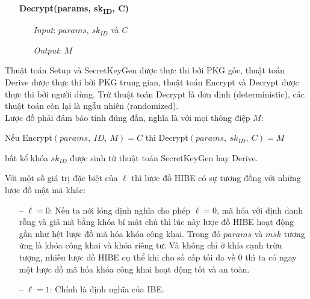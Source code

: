 \documentclass[class=report, crop=false]{standalone}
\begin{document}
\begin{definition}[HIBE]
\begin{itemize}
				\item[] {\sffamily\bfseries Decrypt(params, sk\textsubscript{ID}, C)}
				\begin{itemize}
					\item[\textbullet] \textit{Input}: $params$, $sk_{ID}$ và $C$
					\item[\textbullet] \textit{Output}: $M$
				\end{itemize}
			\end{itemize}
			\vspace{-\baselineskip}\indent\indent
			Thuật toán \textsf{Setup} và \textsf{SecretKeyGen} được thực thi bởi PKG gốc, thuật toán \textsf{Derive} được thực thi bởi PKG trung gian, thuật toán \textsf{Encrypt} và \textsf{Decrypt} được thực thi bởi người dùng. Trừ thuật toán \textsf{Decrypt} là đơn định (deterministic), các thuật toán còn lại là ngẫu nhiên (randomized). \\ \indent
			Lược đồ phải đảm bảo tính đúng đắn, nghĩa là với mọi thông điệp $M$:
			\vspace{-\baselineskip}
			\begin{center}
				Nếu \hspace{1ex} \textsf{Encrypt}$(params,\ ID,\ M) = C$ \hspace{1ex} thì \hspace{1ex} \textsf{Decrypt}$(params,\ sk_{ID},\ C) = M$
			\end{center}
			\vspace{-\baselineskip}
			bất kể khóa $sk_{ID}$ được sinh từ thuật toán \textsf{SecretKeyGen} hay \textsf{Derive}.
		\end{definition}
		\begin{remark}
			Với một số giá trị đặc biệt của $\ell$ thì lược đồ HIBE có sự tương đồng với những lược đồ mật mã khác:
			\vspace{-0.5cm}
			\begin{itemize}
				\item[--] $\ell = 0$: Nếu ta nới lỏng định nghĩa cho phép $\ell = 0$, mã hóa với định danh rỗng và giả mã bằng khóa bí mật chủ thì lúc này lược đồ HIBE hoạt động gần như hệt lược đồ mã hóa khóa công khai. Trong đó $params$ và $msk$ tương ứng là khóa công khai và khóa riêng tư. Và không chỉ ở khía cạnh trừu tượng, nhiều lược đồ HIBE cụ thể khi cho số cấp tối đa về 0 thì ta có ngay một lược đồ mã hóa khóa công khai hoạt động tốt và an toàn.
				\item[--] $\ell = 1$: Chính là định nghĩa của IBE.
			\end{itemize}
		\end{remark}
\end{document}
